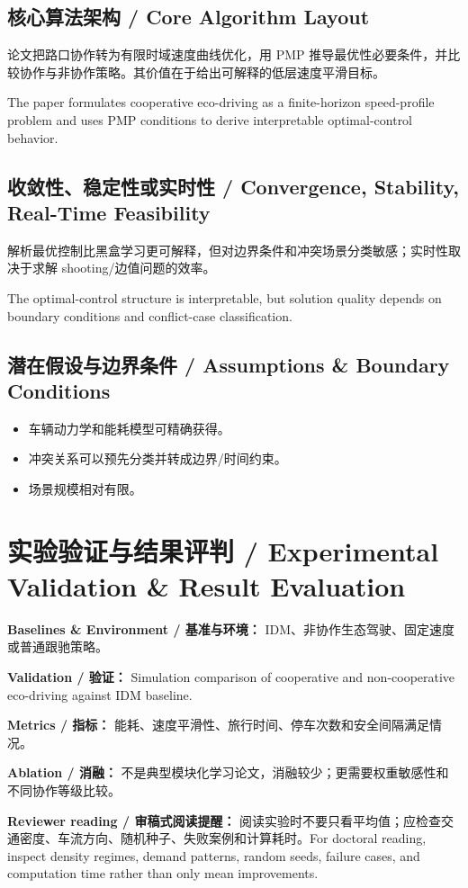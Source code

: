 \documentclass[UTF8,a4paper,11pt,fontset=fandol]{ctexart}
\begin{document}
\subsection{核心算法架构 / Core Algorithm Layout}
论文把路口协作转为有限时域速度曲线优化，用 PMP 推导最优性必要条件，并比较协作与非协作策略。其价值在于给出可解释的低层速度平滑目标。

The paper formulates cooperative eco-driving as a finite-horizon speed-profile problem and uses PMP conditions to derive interpretable optimal-control behavior.

\subsection{收敛性、稳定性或实时性 / Convergence, Stability, Real-Time Feasibility}
解析最优控制比黑盒学习更可解释，但对边界条件和冲突场景分类敏感；实时性取决于求解 shooting/边值问题的效率。

The optimal-control structure is interpretable, but solution quality depends on boundary conditions and conflict-case classification.

\subsection{潜在假设与边界条件 / Assumptions \& Boundary Conditions}
\begin{itemize}
\item 车辆动力学和能耗模型可精确获得。
\item 冲突关系可以预先分类并转成边界/时间约束。
\item 场景规模相对有限。
\end{itemize}


\section{实验验证与结果评判 / Experimental Validation \& Result Evaluation}
\textbf{Baselines \& Environment / 基准与环境：} IDM、非协作生态驾驶、固定速度或普通跟驰策略。

\textbf{Validation / 验证：} Simulation comparison of cooperative and non-cooperative eco-driving against IDM baseline.

\textbf{Metrics / 指标：} 能耗、速度平滑性、旅行时间、停车次数和安全间隔满足情况。

\textbf{Ablation / 消融：} 不是典型模块化学习论文，消融较少；更需要权重敏感性和不同协作等级比较。

\textbf{Reviewer reading / 审稿式阅读提醒：} 阅读实验时不要只看平均值；应检查交通密度、车流方向、随机种子、失败案例和计算耗时。For doctoral reading, inspect density regimes, demand patterns, random seeds, failure cases, and computation time rather than only mean improvements.
\end{document}
